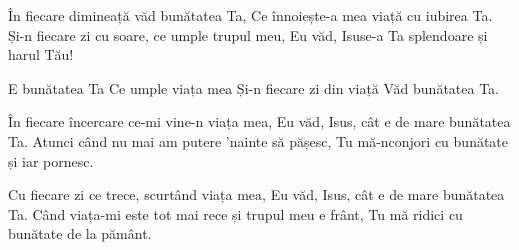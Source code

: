 \beginverse
În fiecare dimineață văd bunătatea Ta,
Ce înnoiește-a mea viață cu iubirea Ta.
Și-n fiecare zi cu soare, ce umple trupul meu,
Eu văd, Isuse-a Ta splendoare și harul Tău!
\endverse

\beginchorus
E bunătatea Ta
Ce umple viața mea
Și-n fiecare zi din viață
Văd bunătatea Ta.
\endchorus

\beginverse
În fiecare încercare ce-mi vine-n viața mea,
Eu văd, Isus, cât e de mare bunătatea Ta.
Atunci când nu mai am putere ’nainte să pășesc,
Tu mă-nconjori cu bunătate și iar pornesc.
\endverse

\beginverse
Cu fiecare zi ce trece, scurtând viața mea,
Eu văd, Isus, cât e de mare bunătatea Ta.
Când viața-mi este tot mai rece și trupul meu e frânt,
Tu mă ridici cu bunătate de la pământ.
\endverse
\endsong